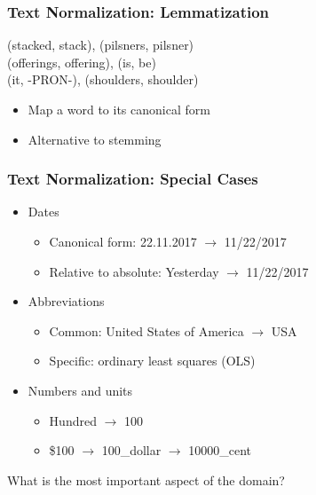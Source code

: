 \begin{frame}
    \frametitle{Text Normalization: Lemmatization}
\begin{spacing}{1.6}
    (stacked, stack), (pilsners, pilsner) \\
    (offerings, offering), (is, be) \\
    (it, -PRON-), (shoulders, shoulder)
\end{spacing}
\vspace{10pt}
\begin{itemize}
\item Map a word to its canonical form
\item Alternative to stemming
\end{itemize}
\end{frame}

\begin{frame}
    \frametitle{Text Normalization: Special Cases}
\begin{itemize}
\item Dates
\begin{itemize}
\item Canonical form: 22.11.2017 $\rightarrow$ 11/22/2017
\item Relative to absolute: Yesterday $\rightarrow$ 11/22/2017
\end{itemize}
\item Abbreviations
\begin{itemize}
\item Common: United States of America $\rightarrow$ USA
\item Specific: ordinary least squares (OLS)
\end{itemize}
\item Numbers and units
\begin{itemize}
\item Hundred $\rightarrow$ 100
\item \$100 $\rightarrow$ 100\_dollar $\rightarrow$ 10000\_cent
\end{itemize}
\end{itemize}

\vspace{10pt}
What is the most important aspect of the domain?
\end{frame}

